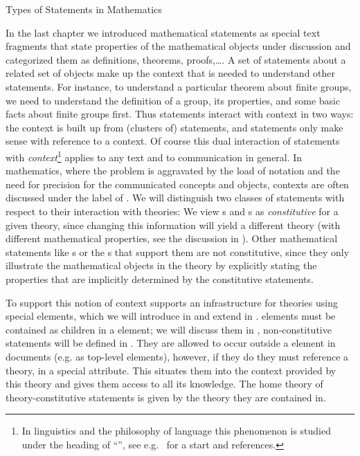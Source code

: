 \begin{omgroup}[id=statements-constitutive]{Types of Statements in Mathematics}
\begin{module}[id=statementtypes]

  In the last chapter we introduced mathematical statements as special text fragments that
  state properties of the mathematical objects under discussion and categorized them as
  definitions, theorems, proofs,\ldots. A set of statements about a related set of objects
  make up the context that is needed to understand other statements.  For instance, to
  understand a particular theorem about finite groups, we need to understand the
  definition of a group, its properties, and some basic facts about finite groups
  first. Thus statements interact with context in two ways: the context is built up from
  (clusters of) statements, and statements only make sense with reference to a context. Of
  course this dual interaction of statements with {\emph{context}}\footnote{In linguistics
    and the philosophy of language this phenomenon is studied under the heading of
    ``{}'', see e.g.~\cite{KamRey:fdtl93}
    for a start and references.}  applies to any text and to communication in general. In
  mathematics, where the problem is aggravated by the load of notation and the need for
  precision for the communicated concepts and objects, contexts are often discussed under
  the label of . We will distinguish
  two classes of statements with respect to their interaction with theories: We view
  {s} and {s} as {\emph{constitutive}} for a given
  theory, since changing this information will yield a different theory (with different
  mathematical properties, see the discussion in {}).  Other
  mathematical statements like {s} or the {s} that
  support them are not constitutive, since they only illustrate the mathematical objects
  in the theory by explicitly stating the properties that are implicitly determined by the
  constitutive statements.
  
\begin{omtext}
To support this notion of context \omdoc supports an infrastructure for theories using
special  elements, which we will introduce in  and
extend in .
 elements must be contained as
children in a  element; we will discuss them in
, non-constitutive statements will be defined in
. They are allowed to occur outside a  element in
\omdoc documents (e.g. as top-level elements), however, if they do they must reference a
theory,  in a special
 attribute. This situates them into the context provided by
this theory and gives them access to all its knowledge. The home theory of
theory-constitutive statements is given by the theory they are contained in.
\end{omtext}


\end{module}
\end{omgroup}
